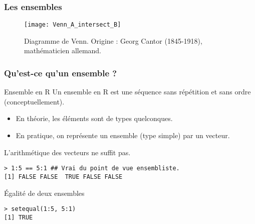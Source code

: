 \documentclass[10pt]{beamer}
\begin{document}
\begin{frame}
  \frametitle{Les ensembles}
  \begin{figure}[t]
    \centering
    \texttt{[image: Venn\_A\_intersect\_B]}
    \caption{Diagramme de Venn. \newline Origine : Georg Cantor (1845-1918), mathématicien allemand. }
  \end{figure}
\end{frame}

\begin{frame}[fragile]
  \frametitle{Qu'est-ce qu'un ensemble ?}

  \begin{alertblock}{Ensemble en R}
    Un ensemble en R est une séquence sans répétition et sans ordre (conceptuellement). 
    \begin{itemize}
    \item En théorie, les éléments sont de types quelconques.
    \item En pratique, on représente un ensemble (type simple) par un vecteur.
    \end{itemize}
\end{alertblock}



  \begin{exampleblock}{L'arithmétique des vecteurs ne suffit pas.}
    \begin{lstlisting}[style=block]
> 1:5 == 5:1 ## Vrai du point de vue ensembliste.
[1] FALSE FALSE  TRUE FALSE FALSE      
    \end{lstlisting}
  \end{exampleblock}


  \begin{block}{Égalité de deux ensembles}
    \begin{lstlisting}[style=block]
> setequal(1:5, 5:1)
[1] TRUE      
    \end{lstlisting}
  \end{block}
\end{frame}
\end{document}
